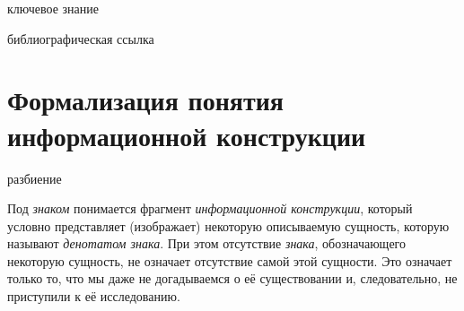 \begin{SCn}
    \begin{scnrelfromlist}{ключевое знание}
    \end{scnrelfromlist}

    \bigskip

    \begin{scnrelfromlist}{библиографическая ссылка}
    \end{scnrelfromlist}

\end{SCn}



\section{Формализация понятия информационной конструкции}
\label{section_information_construction_formalization}

\begin{SCn}

    \begin{scnrelfromset}{разбиение}
    \end{scnrelfromset}

\end{SCn}

Под \textit{знаком} понимается фрагмент \textit{информационной конструкции}, который условно представляет (изображает) некоторую описываемую сущность, которую называют \textit{денотатом знака}.
При этом отсутствие \textit{знака}, обозначающего некоторую сущность, не означает отсутствие самой этой сущности.
Это означает только то, что мы даже не догадываемся о её существовании и, следовательно, не приступили к её исследованию.

